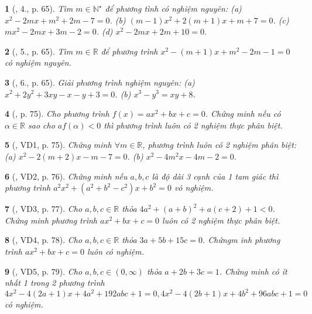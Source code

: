 \documentclass{article}
\newtheorem{baitoan}{}
\begin{document}
\begin{baitoan}[\cite{Thu_Viet_Minh_ptb2}, 4., p. 65]
	Tìm $m\in\mathbb{N}^\star$ để phương tình có nghiệm nguyên: (a) $x^2 - 2mx + m^2 + 2m - 7 = 0$. (b) $(m - 1)x^2 + 2(m + 1)x + m + 7 = 0$. (c) $mx^2 - 2mx + 3m - 2 = 0$. (d) $x^2 - 2mx + 2m + 10 = 0$.
\end{baitoan}

\begin{baitoan}[\cite{Thu_Viet_Minh_ptb2}, 5., p. 65]
	Tìm $m\in\mathbb{R}$ để phương trình $x^2 - (m + 1)x + m^2 - 2m - 1 = 0$ có nghiệm nguyên.
\end{baitoan}

\begin{baitoan}[\cite{Thu_Viet_Minh_ptb2}, 6., p. 65]
	Giải phương trình nghiệm nguyên: (a) $x^2 + 2y^2 + 3xy - x - y + 3 = 0$. (b) $x^3 - y^3 = xy + 8$.
\end{baitoan}

\begin{baitoan}[\cite{Thu_Viet_Minh_ptb2}, p. 75]
	Cho phương trình $f(x) = ax^2 + bx + c = 0$. Chứng minh nếu có $\alpha\in\mathbb{R}$ sao cho $af(\alpha) < 0$ thì phương trình luôn có 2 nghiệm thực phân biệt.
\end{baitoan}

\begin{baitoan}[\cite{Thu_Viet_Minh_ptb2}, VD1, p. 75]
	Chứng minh $\forall m\in\mathbb{R}$, phương trình luôn có 2 nghiệm phân biệt: (a) $x^2 - 2(m + 2)x - m - 7 = 0$. (b) $x^2 - 4m^2x - 4m - 2 = 0$.
\end{baitoan}

\begin{baitoan}[\cite{Thu_Viet_Minh_ptb2}, VD2, p. 76]
	Chứng minh nếu $a,b,c$ là độ dài 3 cạnh của 1 tam giác thì phương trình $a^2x^2 + (a^2 + b^2 - c^2)x + b^2 = 0$ vô nghiệm.
\end{baitoan}

\begin{baitoan}[\cite{Thu_Viet_Minh_ptb2}, VD3, p. 77]
	Cho $a,b,c\in\mathbb{R}$ thỏa $4a^2 + (a + b)^2 + a(c + 2) + 1 < 0$. Chứng minh phương trình $ax^2 + bx + c = 0$ luôn có 2 nghiệm thực phân biệt.
\end{baitoan}

\begin{baitoan}[\cite{Thu_Viet_Minh_ptb2}, VD4, p. 78]
	Cho $a,b,c\in\mathbb{R}$ thỏa $3a + 5b + 15c = 0$. Chứngm inh phương trình $ax^2 + bx + c = 0$ luôn có nghiệm.
\end{baitoan}

\begin{baitoan}[\cite{Thu_Viet_Minh_ptb2}, VD5, p. 79]
	Cho $a,b,c\in(0,\infty)$ thỏa $a + 2b + 3c = 1$. Chứng minh có ít nhất 1 trong 2 phương trình $4x^2 - 4(2a + 1)x + 4a^2 + 192abc + 1 = 0,4x^2 - 4(2b + 1)x + 4b^2 + 96abc + 1 = 0$ có nghiệm.
\end{baitoan}
\end{document}
